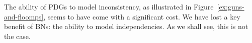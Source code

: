 \documentclass{article}
\numberwithin{equation}{section}
\begin{document}
The ability of PDGs to model inconsistency, as illustrated in 
Figure~\ref{ex:guns-and-floomps}, seems to have come with a
significant cost.  We have lost a key benefit of BNs: the ability to
model independencies.  
%
As we shall see, this is not the case.   
	

	
\end{document}
